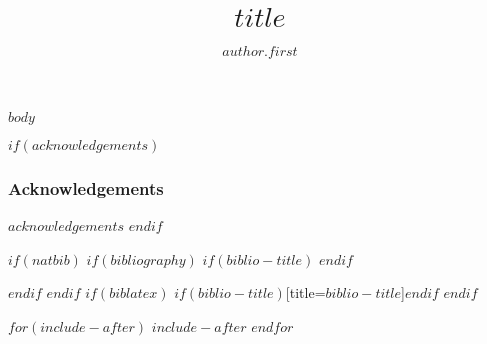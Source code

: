 \documentclass[defaultstyle,11pt]{$documentclass$}
\title{$title$}
\author{$author.first$}{$author.last$}
\begin{document}
$body$


\newpage
$if(acknowledgements)$
\subsubsection*{Acknowledgements}
{\small $acknowledgements$}
$endif$


$if(natbib)$
$if(bibliography)$
$if(biblio-title)$
\renewcommand\refname{$biblio-title$}
$endif$

$endif$
$endif$
$if(biblatex)$
\printbibliography$if(biblio-title)$[title=$biblio-title$]$endif$
$endif$

$for(include-after)$
$include-after$
$endfor$
\end{document}
